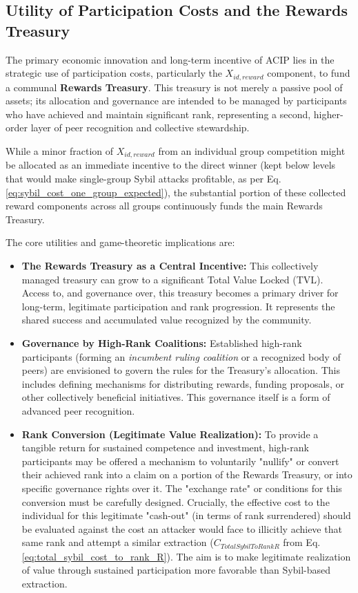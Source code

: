 \documentclass{article}
\begin{document}
\begin{CJK}{UTF8}{gbsn}
        \subsection*{Utility of Participation Costs and the Rewards Treasury}\label{sec:utility_and_treasury}
        The primary economic innovation and long-term incentive of ACIP lies in the strategic use of participation costs, particularly the $X_{id,reward}$ component, to fund a communal \textbf{Rewards Treasury}. This treasury is not merely a passive pool of assets; its allocation and governance are intended to be managed by participants who have achieved and maintain significant rank, representing a second, higher-order layer of peer recognition and collective stewardship.

        While a minor fraction of $X_{id,reward}$ from an individual group competition might be allocated as an immediate incentive to the direct winner (kept below levels that would make single-group Sybil attacks profitable, as per Eq. \ref{eq:sybil_cost_one_group_expected}), the substantial portion of these collected reward components across all groups continuously funds the main Rewards Treasury.

    The core utilities and game-theoretic implications are:
    \begin{itemize}
        \item \textbf{The Rewards Treasury as a Central Incentive:} This collectively managed treasury can grow to a significant Total Value Locked (TVL). Access to, and governance over, this treasury becomes a primary driver for long-term, legitimate participation and rank progression. It represents the shared success and accumulated value recognized by the community.

        \item \textbf{Governance by High-Rank Coalitions:} Established high-rank participants (forming an \textit{incumbent ruling coalition} or a recognized body of peers) are envisioned to govern the rules for the Treasury's allocation. This includes defining mechanisms for distributing rewards, funding proposals, or other collectively beneficial initiatives. This governance itself is a form of advanced peer recognition.

        \item \textbf{Rank Conversion (Legitimate Value Realization):} To provide a tangible return for sustained competence and investment, high-rank participants may be offered a mechanism to voluntarily "nullify" or convert their achieved rank into a claim on a portion of the Rewards Treasury, or into specific governance rights over it. The "exchange rate" or conditions for this conversion must be carefully designed. Crucially, the effective cost to the individual for this legitimate "cash-out" (in terms of rank surrendered) should be evaluated against the cost an attacker would face to illicitly achieve that same rank and attempt a similar extraction ($C_{TotalSybilToRankR}$ from Eq. \ref{eq:total_sybil_cost_to_rank_R}). The aim is to make legitimate realization of value through sustained participation more favorable than Sybil-based extraction.


\end{itemize}
\end{CJK}
\end{document}

